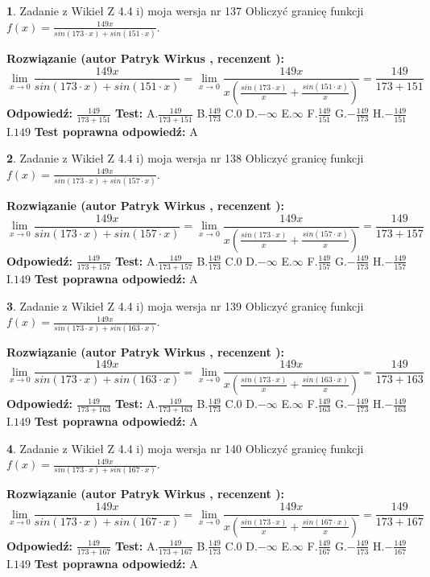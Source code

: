 \documentclass[12pt, a4paper]{article}
\theoremstyle{definition} %
\newtheorem{zad}{}
\newcommand{\zadStart}[1]{\begin{zad}#1\newline}
\newcommand{\zadStop}{\end{zad}}
\newcommand{\rozwStart}[2]{\noindent \textbf{Rozwiązanie (autor #1 , recenzent #2): }\newline}
\newcommand{\rozwStop}{\newline}
\newcommand{\odpStart}{\noindent \textbf{Odpowiedź:}\newline}
\newcommand{\odpStop}{\newline}
\newcommand{\testStart}{\noindent \textbf{Test:}\newline}
\newcommand{\testStop}{\newline}
\newcommand{\kluczStart}{\noindent \textbf{Test poprawna odpowiedź:}\newline}
\newcommand{\kluczStop}{\newline}
\begin{document}
\zadStart{Zadanie z Wikieł Z 4.4 i) moja wersja nr 137}
Obliczyć granicę funkcji $f(x)=\frac{149x}{sin(173\cdot x) +sin(151\cdot x)}$.
\zadStop
\rozwStart{Patryk Wirkus}{}
$$\lim\limits_{x\to 0}\frac{149x}{sin(173\cdot x) +sin(151\cdot x)}=\lim\limits_{x\to 0}\frac{149x}{x(\frac{sin(173\cdot x)}{x}+\frac{sin(151\cdot x)}{x})}=\frac{149}{173+151}$$
\rozwStop
\odpStart
$\frac{149}{173+151}$
\odpStop
\testStart
A.$\frac{149}{173+151}$
B.$\frac{149}{173}$
C.$0$
D.$-\infty$
E.$\infty$
F.$\frac{149}{151}$
G.$-\frac{149}{173}$
H.$-\frac{149}{151}$
I.$149$
\testStop
\kluczStart
A
\kluczStop



\zadStart{Zadanie z Wikieł Z 4.4 i) moja wersja nr 138}
Obliczyć granicę funkcji $f(x)=\frac{149x}{sin(173\cdot x) +sin(157\cdot x)}$.
\zadStop
\rozwStart{Patryk Wirkus}{}
$$\lim\limits_{x\to 0}\frac{149x}{sin(173\cdot x) +sin(157\cdot x)}=\lim\limits_{x\to 0}\frac{149x}{x(\frac{sin(173\cdot x)}{x}+\frac{sin(157\cdot x)}{x})}=\frac{149}{173+157}$$
\rozwStop
\odpStart
$\frac{149}{173+157}$
\odpStop
\testStart
A.$\frac{149}{173+157}$
B.$\frac{149}{173}$
C.$0$
D.$-\infty$
E.$\infty$
F.$\frac{149}{157}$
G.$-\frac{149}{173}$
H.$-\frac{149}{157}$
I.$149$
\testStop
\kluczStart
A
\kluczStop



\zadStart{Zadanie z Wikieł Z 4.4 i) moja wersja nr 139}
Obliczyć granicę funkcji $f(x)=\frac{149x}{sin(173\cdot x) +sin(163\cdot x)}$.
\zadStop
\rozwStart{Patryk Wirkus}{}
$$\lim\limits_{x\to 0}\frac{149x}{sin(173\cdot x) +sin(163\cdot x)}=\lim\limits_{x\to 0}\frac{149x}{x(\frac{sin(173\cdot x)}{x}+\frac{sin(163\cdot x)}{x})}=\frac{149}{173+163}$$
\rozwStop
\odpStart
$\frac{149}{173+163}$
\odpStop
\testStart
A.$\frac{149}{173+163}$
B.$\frac{149}{173}$
C.$0$
D.$-\infty$
E.$\infty$
F.$\frac{149}{163}$
G.$-\frac{149}{173}$
H.$-\frac{149}{163}$
I.$149$
\testStop
\kluczStart
A
\kluczStop



\zadStart{Zadanie z Wikieł Z 4.4 i) moja wersja nr 140}
Obliczyć granicę funkcji $f(x)=\frac{149x}{sin(173\cdot x) +sin(167\cdot x)}$.
\zadStop
\rozwStart{Patryk Wirkus}{}
$$\lim\limits_{x\to 0}\frac{149x}{sin(173\cdot x) +sin(167\cdot x)}=\lim\limits_{x\to 0}\frac{149x}{x(\frac{sin(173\cdot x)}{x}+\frac{sin(167\cdot x)}{x})}=\frac{149}{173+167}$$
\rozwStop
\odpStart
$\frac{149}{173+167}$
\odpStop
\testStart
A.$\frac{149}{173+167}$
B.$\frac{149}{173}$
C.$0$
D.$-\infty$
E.$\infty$
F.$\frac{149}{167}$
G.$-\frac{149}{173}$
H.$-\frac{149}{167}$
I.$149$
\testStop
\kluczStart
A
\kluczStop
\end{document}
